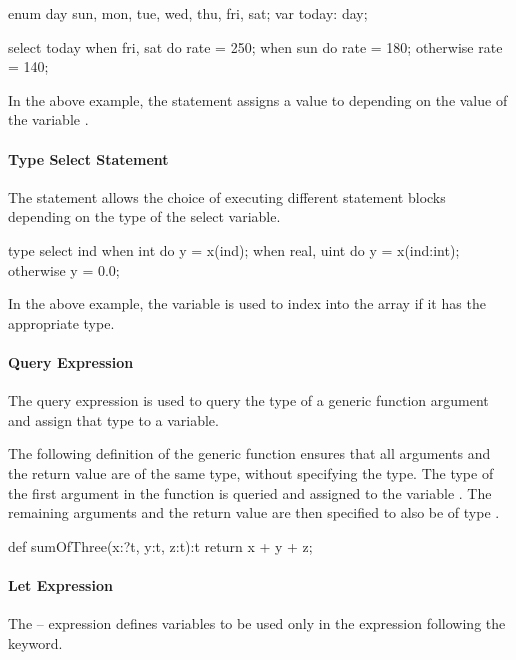 \begin{example}
\begin{chapel}
enum day {sun, mon, tue, wed, thu, fri, sat};
var today: day;

select today {
  when fri, sat do rate = 250;
  when sun do rate = 180;
  otherwise rate = 140;
}
\end{chapel}
In the above example, the  statement assigns
a value to  depending on the value of the 
variable .
\end{example}

\paragraph{Type Select Statement} 
The  statement allows the choice of
executing different statement blocks depending on the type
of the select variable.

\begin{example}
\begin{chapel}
type select ind {
  when int do y = x(ind);
  when real, uint do y = x(ind:int);
  otherwise y = 0.0;
}
\end{chapel}
In the above example, the variable  is used
to index into the array  if it has the appropriate
type.
\end{example}

\paragraph{Query Expression}
The query expression is used to query the type of a generic function argument
and assign that type to a variable.
\begin{example}
The following definition of the generic function  
ensures that all arguments and the return value are of the same type, 
without specifying the type.
The type of the first argument in the 
function is queried and assigned to the variable .  The remaining
arguments and the return value are then specified to also be of type .
\begin{chapel}
def sumOfThree(x:?t, y:t, z:t):t {
   return x + y + z;
}
\end{chapel}
\end{example}

\paragraph{Let Expression} 
The -- expression defines variables to
be used only in the expression following the  keyword.

